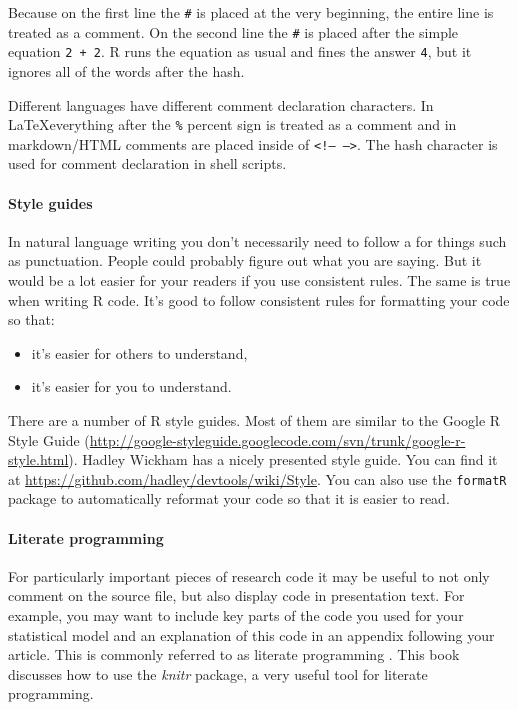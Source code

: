\documentclass[ChapterTOCs,krantz1]{krantz}\usepackage{graphicx, color}
\begin{document}
Because on the first line the {\tt{\#}} is placed at the very beginning, the entire line is treated as a comment. On the second line the {\tt{\#}} is placed after the simple equation {\tt{2 + 2}}. R runs the equation as usual and fines the answer {\tt{4}}, but it ignores all of the words after the hash. 

Different languages have different comment declaration characters. In \LaTeX everything after the {\tt{\%}} percent sign is treated as a comment and in markdown/HTML comments are placed inside of {\tt{\textless !-- --\textgreater}}. The hash character is used for comment declaration in shell scripts.

\paragraph{Style guides}
In natural language writing you don't necessarily need to follow a  for things such as punctuation. People could probably figure out what you are saying. But it would be a lot easier for your readers if you use consistent rules. The same is true when writing R code. It's good to follow consistent rules for formatting your code so that:

\begin{itemize}
    \item it's easier for others to understand,
    \item it's easier for you to understand.
\end{itemize}

There are a number of R style guides. Most of them are similar to the Google R Style Guide  (\url{http://google-styleguide.googlecode.com/svn/trunk/google-r-style.html}). Hadley Wickham  has a nicely presented style guide. You can find it at \url{https://github.com/hadley/devtools/wiki/Style}. You can also use the {\tt{formatR}}  package to automatically reformat your code so that it is easier to read.

\paragraph{Literate programming}

For particularly important pieces of research code it may be useful to not only comment on the source file, but also display code in presentation text. For example, you may want to include key parts of the code you used for your statistical model and an explanation of this code in an appendix following your article. This is commonly referred to as literate programming  \cite{Knuth1992}. This book discusses how to use the {\emph{knitr}} package, a very useful tool for literate programming. 
\end{document}
